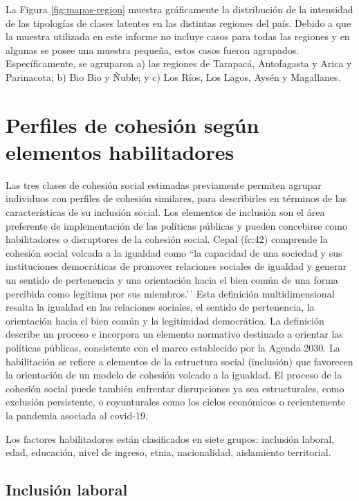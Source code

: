 \documentclass[
  12pt,
]{book}
\begin{document}
La Figura \ref{fig:mapas-region} muestra gráficamente la distribución de la intensidad de las tipologías de clases latentes en las distintas regiones del país. Debido a que la muestra utilizada en este informe no incluye casos para todas las regiones y en algunas se posee una muestra pequeña, estos casos fueron agrupados. Específicamente, se agruparon a) las regiones de Tarapacá, Antofagasta y Arica y Parinacota; b) Bio Bio y Ñuble; y c) Los Ríos, Los Lagos, Aysén y Magallanes.

\hypertarget{perfiles-de-cohesiuxf3n-seguxfan-elementos-habilitadores}{%
\section{Perfiles de cohesión según elementos habilitadores}\label{perfiles-de-cohesiuxf3n-seguxfan-elementos-habilitadores}}

Las tres clases de cohesión social estimadas previamente permiten agrupar individuos con perfiles de cohesión similares, para describirles en términos de las características de su inclusión social. Los elementos de inclusión son el área preferente de implementación de las políticas públicas y pueden concebirse como habilitadores o disruptores de la cohesión social. Cepal (fc:42) comprende la cohesión social volcada a la igualdad como ``la capacidad de una sociedad y sus instituciones democráticas de promover relaciones sociales de igualdad y generar un sentido de pertenencia y una orientación hacia el bien común de una forma percibida como legítima por sus miembros.'\,' Esta definición multidimensional resalta la igualdad en las relaciones sociales, el sentido de pertenencia, la orientación hacia el bien común y la legitimidad democrática. La definición describe un proceso e incorpora un elemento normativo destinado a orientar las políticas públicas, consistente con el marco establecido por la Agenda 2030. La habilitación se refiere a elementos de la estructura social (inclusión) que favorecen la orientación de un modelo de cohesión volcado a la igualdad. El proceso de la cohesión social puede también enfrentar disrupciones ya sea estructurales, como exclusión persistente, o coyunturales como los ciclos económicos o recientemente la pandemia asociada al covid-19.

Los factores habilitadores están clasificados en siete grupos: inclusión laboral, edad, educación, nivel de ingreso, etnia, nacionalidad, aislamiento territorial.

\hypertarget{inclusiuxf3n-laboral}{%
\subsection{Inclusión laboral}\label{inclusiuxf3n-laboral}}
\end{document}
